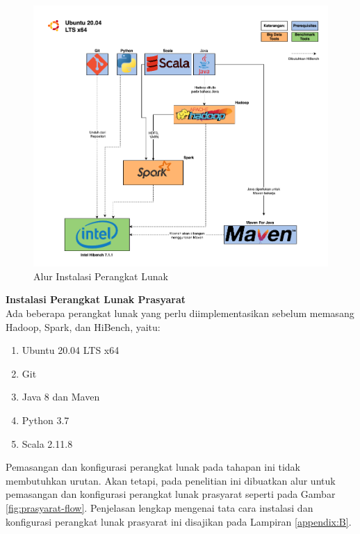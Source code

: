 \begin{landscape}
\begin{figure}[h]
    \centering
    \includegraphics[height=0.65\linewidth]{figures/ch03/alurkerja-soft.png}
    \caption{Alur Instalasi Perangkat Lunak}
    \label{fig:alurkerja-soft}
\end{figure}
\end{landscape}

\textbf{Instalasi Perangkat Lunak Prasyarat}\\
Ada beberapa perangkat lunak yang perlu diimplementasikan sebelum memasang Hadoop, Spark, dan HiBench, yaitu:
\begin{enumerate}
	\item Ubuntu 20.04 LTS x64
	\item Git
	\item Java 8 dan Maven
	\item Python 3.7
	\item Scala 2.11.8
\end{enumerate}

Pemasangan dan konfigurasi perangkat lunak pada tahapan ini tidak membutuhkan urutan. Akan tetapi, pada penelitian ini dibuatkan alur untuk pemasangan dan konfigurasi perangkat lunak prasyarat seperti pada Gambar \ref{fig:prasyarat-flow}. Penjelasan lengkap mengenai tata cara instalasi dan konfigurasi perangkat lunak prasyarat ini disajikan pada Lampiran \ref{appendix:B}. \\

